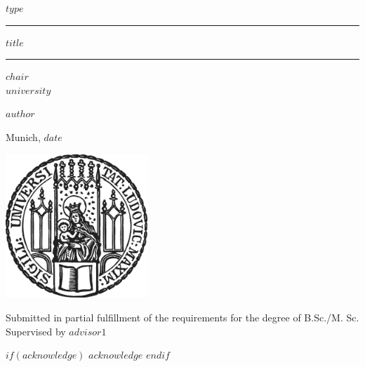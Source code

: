 \documentclass[12pt]{article}
\newcommand{\mytitle}{$title$}
\begin{document}

\begin{titlepage}
\begin{center}

\LARGE
$type$

\vspace{0.5cm}

\rule{\textwidth}{1.5pt}
\LARGE
\textbf{\mytitle}
\rule{\textwidth}{1.5pt}

\vspace{0.5cm}

\large
$chair$ \\
$university$

\vfill

\Large
\textbf{$author$}

\vfill

\large
Munich, $date$

\vfill

\includegraphics[width = 0.4\textwidth]{figure/sigillum.png}

\vfill

\normalsize
Submitted in partial fulfillment of the requirements for the degree of B.Sc./M. Sc.
\\

Supervised by $advisor1$

\end{center}
\end{titlepage}


\newpage

$if(acknowledge)$
\newpage
$acknowledge$
$endif$
\pagestyle{plain}
\setcounter{page}{1}    %
\end{document}
